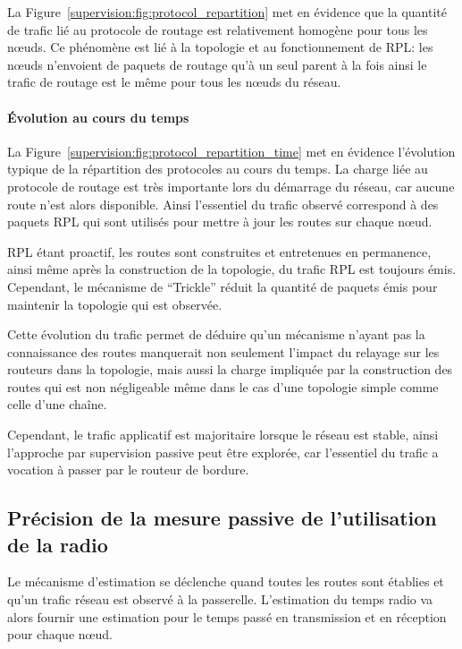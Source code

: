 La Figure~\ref{supervision:fig:protocol_repartition} met en évidence que la quantité de trafic lié au protocole de routage est relativement homogène pour tous les nœuds.
Ce phénomène est lié à la topologie et au fonctionnement de \ac{RPL}: les nœuds n'envoient de paquets de routage qu'à un seul parent à la fois ainsi le trafic de routage est le même pour tous les nœuds du réseau.

\paragraph{Évolution au cours du temps}

La Figure~\ref{supervision:fig:protocol_repartition_time} met en évidence l'évolution typique de la répartition des protocoles au cours du temps.
La charge liée au protocole de routage est très importante lors du démarrage du réseau, car aucune route n'est alors disponible.
Ainsi l'essentiel du trafic observé correspond à des paquets \ac{RPL} qui sont utilisés pour mettre à jour les routes sur chaque nœud.

\ac{RPL} étant proactif, les routes sont construites et entretenues en permanence, ainsi même après la construction de la topologie, du trafic \ac{RPL} est toujours émis.
Cependant, le mécanisme de ``Trickle'' réduit la quantité de paquets émis pour maintenir la topologie qui est observée.

Cette évolution du trafic permet de déduire qu'un mécanisme n'ayant pas la connaissance des routes manquerait non seulement l'impact du relayage sur les routeurs dans la topologie, mais aussi la charge impliquée par la construction des routes qui est non négligeable même dans le cas d'une topologie simple comme celle d'une chaîne.

Cependant, le trafic applicatif est majoritaire lorsque le réseau est stable, ainsi l'approche par supervision passive peut être explorée, car l'essentiel du trafic a vocation à passer par le routeur de bordure.

\subsection{Précision de la mesure passive de l'utilisation de la radio}

Le mécanisme d'estimation se déclenche quand toutes les routes sont établies et qu'un trafic réseau est observé à la passerelle.
L'estimation du temps radio va alors fournir une estimation pour le temps passé en transmission et en réception pour chaque nœud.

